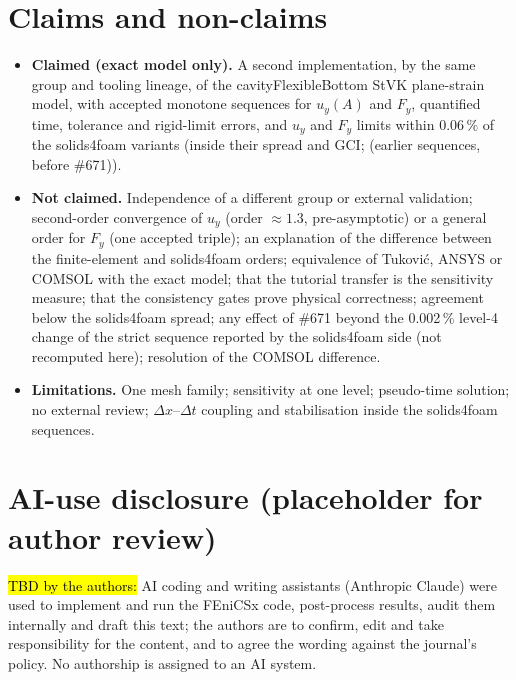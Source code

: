 \documentclass[sn-mathphys,Numbered]{sn-jnl}
\newcommand{\legbc}{\textcolor{red!70!black}{(earlier sequences, before \#671)}}
\begin{document}
\section{Claims and non-claims}\label{sec:cv_claims}
\begin{itemize}
\item \textbf{Claimed (exact model only).} A second implementation, by the same group and tooling lineage, of the cavityFlexibleBottom StVK plane-strain model, with accepted monotone sequences for $u_y(A)$ and $F_y$, quantified time, tolerance and rigid-limit errors, and $u_y$ and $F_y$ limits within $0.06\,\%$ of the solids4foam variants (inside their spread and GCI; \legbc).
\item \textbf{Not claimed.} Independence of a different group or external validation; second-order convergence of $u_y$ (order $\approx1.3$, pre-asymptotic) or a general order for $F_y$ (one accepted triple); an explanation of the difference between the finite-element and solids4foam orders; equivalence of Tukovi\'c, ANSYS or COMSOL with the exact model; that the tutorial transfer is the sensitivity measure; that the consistency gates prove physical correctness; agreement below the solids4foam spread; any effect of \#671 beyond the 0.002\,\% level-4 change of the strict sequence reported by the solids4foam side (not recomputed here); resolution of the COMSOL difference.
\item \textbf{Limitations.} One mesh family; sensitivity at one level; pseudo-time solution; no external review; $\Delta x$--$\Delta t$ coupling and stabilisation inside the solids4foam sequences.
\end{itemize}

\section*{AI-use disclosure (placeholder for author review)}
\hl{TBD by the authors:} AI coding and writing assistants (Anthropic Claude) were used to implement and run the FEniCSx code, post-process results, audit them internally and draft this text; the authors are to confirm, edit and take responsibility for the content, and to agree the wording against the journal's policy. No authorship is assigned to an AI system.


\end{document}
